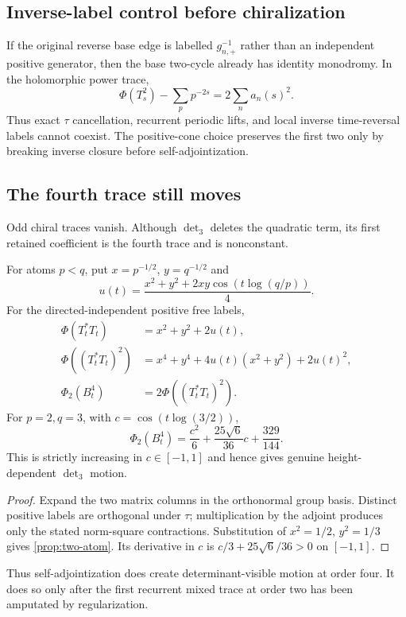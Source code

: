\subsection{Inverse-label control before chiralization}

If the original reverse base edge is labelled $g_{n,+}^{-1}$ rather than an
independent positive generator, then the base two-cycle already has identity
monodromy.  In the holomorphic power trace,
\[
 \Phi(T_s^2)-\sum_pp^{-2s}=2\sum_na_n(s)^2.  \tag{5.5}
\]
Thus exact $\tau$ cancellation, recurrent periodic lifts, and local inverse
time-reversal labels cannot coexist.  The positive-cone choice preserves the
first two only by breaking inverse closure before self-adjointization.

\subsection{The fourth trace still moves}

Odd chiral traces vanish.  Although $\det_3$ deletes the quadratic term, its
first retained coefficient is the fourth trace and is nonconstant.

\begin{proposition}
\label{prop:two-atom}
For atoms $p<q$, put $x=p^{-1/2}$, $y=q^{-1/2}$ and
\[
 u(t)=\frac{x^2+y^2+2xy\cos(t\log(q/p))}{4}.
\]
For the directed-independent positive free labels,
\begin{align}
 \Phi(T_t^*T_t)&=x^2+y^2+2u(t),\tag{5.6}\\
 \Phi((T_t^*T_t)^2)
 &=x^4+y^4+4u(t)(x^2+y^2)+2u(t)^2,\tag{5.7}\\
 \Phi_2(B_t^4)&=2\Phi((T_t^*T_t)^2).\tag{5.8}
\end{align}
For $p=2,q=3$, with $c=\cos(t\log(3/2))$,
\[
 \Phi_2(B_t^4)
 =\frac{c^2}{6}+\frac{25\sqrt6}{36}c+\frac{329}{144}. \tag{5.9}
\]
This is strictly increasing in $c\in[-1,1]$ and hence gives genuine
height-dependent $\det_3$ motion.
\end{proposition}

\begin{proof}
Expand the two matrix columns in the orthonormal group basis.  Distinct
positive labels are orthogonal under $\tau$; multiplication by the adjoint
produces only the stated norm-square contractions.  Substitution of
$x^2=1/2$, $y^2=1/3$ gives \cref{prop:two-atom}.  Its derivative in $c$ is
$c/3+25\sqrt6/36>0$ on $[-1,1]$.
\end{proof}

Thus self-adjointization does create determinant-visible motion at order
four.  It does so only after the first recurrent mixed trace at order two has
been amputated by regularization.
